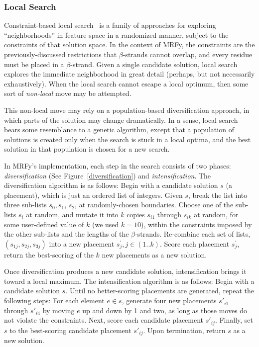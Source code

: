 \documentclass{acm_proc_article-sp}
\begin{document}
\subsubsection{Local Search}\label{localsearch}

Constraint-based local search~\cite{Hentenryck:2009vn} is a family of approaches
for exploring ``neighborhoods'' in feature space in a randomized manner, 
subject to the constraints of that solution space.
In the context of MRFy, the constraints are the previously-discussed 
restrictions that $\beta$-strands cannot overlap, and every residue must be
placed in a $\beta$-strand.
Given a single candidate solution, local search explores the immediate 
neighborhood in great detail (perhaps, but not necessarily exhaustively).
When the local search cannot escape a local optimum, then some sort of 
\emph{non-local} move may be attempted.

This non-local move may rely on a population-based diversification approach,
in which parts of the solution may change dramatically.
In a sense, local search bears some resemblance to a genetic algorithm,
except that a population of solutions is created only when the search is stuck
in a local optima, and the best solution in that population is chosen for a new
search.

In MRFy's implementation, each step in the search consists of two phases: 
\emph{diversification} (See Figure~\ref{diversification}) and 
\emph{intensification}.
The diversification algorithm is as follows:
Begin with a candidate solution $s$ (a placement), which is just
an ordered list of integers.
Given $s$, break the list into three sub-lists $s_{0}, s_{1}$, $s_{2}$, 
at randomly-chosen boundaries.
Choose one of the sub-lists $s_{i}$ at random, and mutate it into $k$ 
copies $s_{i1}$ through $s_{ik}$ at random, for some user-defined value of $k$ 
(we used $k=10$), within
the constraints imposed by the other sub-lists and the lengths of the 
$\beta$-strands.
Re-combine each set of lists, $(s_{1j}, s_{2j}, s_{3j})$ into a new 
placement $s^{\prime}_{j}, j \in (1..k)$.
Score each placement $s^{\prime}_{j}$, return the best-scoring of the $k$ new 
placements as a new solution.

Once diversification produces a new candidate solution, intensification brings
it toward a local maximum.
The intensification algorithm is as follows:
Begin with a candidate solution $s$.
Until no better-scoring placements are generated, repeat the following steps:
For each element $e \in s$, generate four new placements $s'_{i1}$ 
through $s'_{i4}$ by moving $e$ up and down by 1 and two, as long as those 
moves do not violate the constraints.
Next, score each candidate placement $s'_{ij}$.
Finally, set $s$ to the best-scoring candidate placement $s'_{ij}$.
Upon termination, return $s$ as a new solution.
\end{document}
